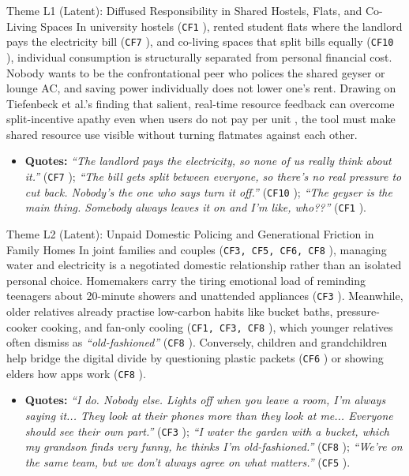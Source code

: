\documentclass[12pt, a4paper]{article}
\begin{document}
\begin{latentcard}{Theme L1 (Latent): Diffused Responsibility in Shared Hostels, Flats, and Co-Living Spaces}
In university hostels (\texttt{CF1} \cite{cf1}), rented student flats where the landlord pays the electricity bill (\texttt{CF7} \cite{cf7}), and co-living spaces that split bills equally (\texttt{CF10} \cite{cf10}), individual consumption is structurally separated from personal financial cost. Nobody wants to be the confrontational peer who polices the shared geyser or lounge AC, and saving power individually does not lower one's rent. Drawing on Tiefenbeck et al.'s finding that salient, real-time resource feedback can overcome split-incentive apathy even when users do not pay per unit \cite{tiefenbeck2018}, the tool must make shared resource use visible without turning flatmates against each other.
\begin{itemize}
    \item \textbf{Quotes:} \textit{``The landlord pays the electricity, so none of us really think about it.''} (\texttt{CF7} \cite{cf7}); \textit{``The bill gets split between everyone, so there's no real pressure to cut back. Nobody's the one who says turn it off.''} (\texttt{CF10} \cite{cf10}); \textit{``The geyser is the main thing. Somebody always leaves it on and I'm like, who??''} (\texttt{CF1} \cite{cf1}).
\end{itemize}
\end{latentcard}

\begin{latentcard}{Theme L2 (Latent): Unpaid Domestic Policing and Generational Friction in Family Homes}
In joint families and couples (\texttt{CF3, CF5, CF6, CF8} \cite{cf3, cf5, cf6, cf8}), managing water and electricity is a negotiated domestic relationship rather than an isolated personal choice. Homemakers carry the tiring emotional load of reminding teenagers about 20-minute showers and unattended appliances (\texttt{CF3} \cite{cf3}). Meanwhile, older relatives already practise low-carbon habits like bucket baths, pressure-cooker cooking, and fan-only cooling (\texttt{CF1, CF3, CF8} \cite{cf1, cf3, cf8}), which younger relatives often dismiss as \textit{``old-fashioned''} (\texttt{CF8} \cite{cf8}). Conversely, children and grandchildren help bridge the digital divide by questioning plastic packets (\texttt{CF6} \cite{cf6}) or showing elders how apps work (\texttt{CF8} \cite{cf8}).
\begin{itemize}
    \item \textbf{Quotes:} \textit{``I do. Nobody else. Lights off when you leave a room, I'm always saying it... They look at their phones more than they look at me... Everyone should see their own part.''} (\texttt{CF3} \cite{cf3}); \textit{``I water the garden with a bucket, which my grandson finds very funny, he thinks I'm old-fashioned.''} (\texttt{CF8} \cite{cf8}); \textit{``We're on the same team, but we don't always agree on what matters.''} (\texttt{CF5} \cite{cf5}).
\end{itemize}
\end{latentcard}
\end{document}
